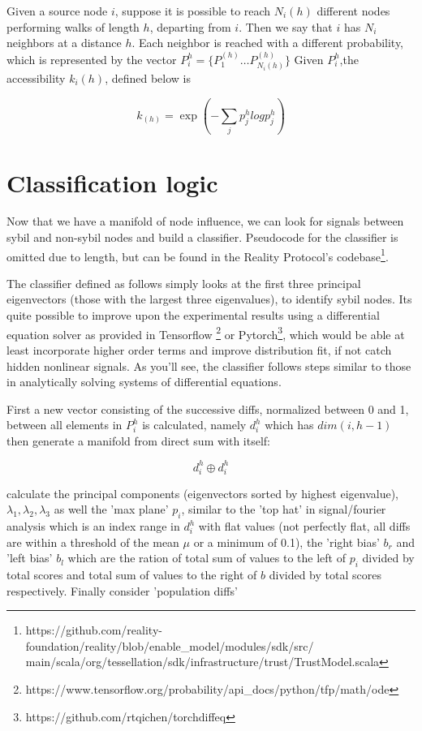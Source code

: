 \documentclass{article}
\begin{document}
Given a source node $i$, suppose it is possible to reach $N_i(h)$ different nodes performing walks of length $h$, departing from $i$. Then we say that $i$ has $N_i$ neighbors at a distance $h$. Each neighbor is reached with a different probability, which is represented by the vector $P_i^h = \{ P_1^{(h)} \dots P_{N_i(h)}^{(h)} \}$ Given $P_i^h$,the accessibility $k_i(h)$, defined below is 
	
	
\begin{equation}
k_(h) = \exp (-\sum_j p^{h}_j log p^{h}_j )
\end{equation}

\section{Classification logic}
Now  that we have a manifold of node influence, we can look for signals between sybil and non-sybil nodes and build a classifier. Pseudocode for the classifier is omitted due to length, but can be found in the Reality Protocol's codebase\footnote{https://github.com/reality-foundation/reality/blob/enable\_model/modules/sdk/src/\\main/scala/org/tessellation/sdk/infrastructure/trust/TrustModel.scala}.

The classifier defined as follows simply looks at the first three principal eigenvectors (those with the largest three eigenvalues), to identify sybil nodes. Its quite possible to improve upon the experimental results using a differential equation solver as provided in Tensorflow \footnote{https://www.tensorflow.org/probability/api\_docs/python/tfp/math/ode} or Pytorch\footnote{https://github.com/rtqichen/torchdiffeq}, which would be able at least incorporate higher order terms and improve distribution fit, if not catch hidden nonlinear signals. As you'll see, the classifier follows steps similar to those in analytically solving systems of differential equations.

First a new vector consisting of the successive diffs, normalized between 0 and 1, between all elements in $P_i^h$ is calculated, namely $d_i^h$ which has $dim(i, h-1)$ then generate a manifold from direct sum with itself:

\begin{equation}
d_i^h \oplus d_i^h
\end{equation}

calculate the principal components (eigenvectors sorted by highest eigenvalue), $\lambda_1, \lambda_2 ,\lambda_3$ as well the 'max plane' $p_i$, similar to the 'top hat' in signal/fourier analysis which is an index range in $d_i^h$ with flat values (not perfectly flat, all diffs are within a threshold of the mean $\mu$ or a minimum of 0.1), the 'right bias' $b_r$ and 'left bias' $b_l$ which are the ration of total sum of values to the left of $p_i$ divided by total scores and  total sum of values to the right of $b$ divided by total scores respectively. Finally consider 'population diffs' 
\end{document}
